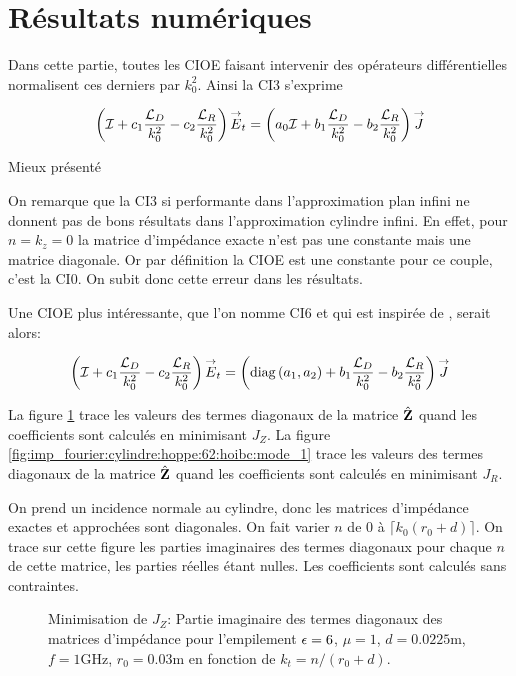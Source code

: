 \section{Résultats numériques}

  Dans cette partie, toutes les CIOE faisant intervenir des opérateurs différentielles normalisent ces derniers par \(k_0^2\). Ainsi la CI3 s'exprime
    
  \begin{equation*}
    \left({\mathcal{I}} + c_1\dfrac{{\mathcal{L}_D}}{k_0^2} -c_2\dfrac{{\mathcal{L}_R}}{k_0^2}\right){\overset{\rightarrow}{E}}_t = \left(a_0{\mathcal{I}} + b_1\dfrac{{\mathcal{L}_D}}{k_0^2} - b_2 \dfrac{{\mathcal{L}_R}}{k_0^2} \right){\overset{\rightarrow}{J}}
  \end{equation*}


  \begin{TODO}
    Mieux présenté
  \end{TODO}
  On remarque que la CI3 si performante dans l'approximation plan infini ne donnent pas de bons résultats dans l’approximation cylindre infini. 
  En effet, pour \(n=k_z=0\) la matrice d'impédance exacte n'est pas une constante mais une matrice diagonale. 
  Or par définition la CIOE est une constante pour ce couple, c'est la CI0. On subit donc cette erreur dans les résultats. 

  Une CIOE plus intéressante, que l'on nomme CI6 et qui est inspirée de \cite[p.~60]{hoppe_impedance_1995}, serait alors:

  \begin{equation*}
    \left({\mathcal{I}} + c_1\dfrac{{\mathcal{L}_D}}{k_0^2} -c_2\dfrac{{\mathcal{L}_R}}{k_0^2}\right){\overset{\rightarrow}{E}}_t = \left(\operatorname{diag}\left(a_1,a_2\right) + b_1\dfrac{{\mathcal{L}_D}}{k_0^2} - b_2 \dfrac{{\mathcal{L}_R}}{k_0^2} \right){\overset{\rightarrow}{J}}
  \end{equation*}

  La figure \ref{fig:imp_fourier:cylindre:hoppe:62:hoibc:mode_2} trace les valeurs des termes diagonaux de la matrice \(\hat{\mathbf{Z}}\) quand les coefficients sont calculés en minimisant \(J_Z\).
  La figure \ref{fig:imp_fourier:cylindre:hoppe:62:hoibc:mode_1} trace les valeurs des termes diagonaux de la matrice \(\hat{\mathbf{Z}}\) quand les coefficients sont calculés en minimisant \(J_R\).

  On prend un incidence normale au cylindre, donc les matrices d'impédance exactes et approchées sont diagonales. On fait varier \(n\) de 0 à \(\lceil k_0 (r_0+d) \rceil\). On trace sur cette figure les parties imaginaires des termes diagonaux pour chaque \(n\) de cette matrice, les parties réelles étant nulles. Les coefficients sont calculés sans contraintes.

  \begin{figure}[!hbt]
    \centering
    
    \caption[CIOE sur empilement de Hoppe & Rahmat-Samii p.~62]{Minimisation de \(J_Z\): Partie imaginaire des termes diagonaux des matrices d'impédance pour l'empilement \(\epsilon = 6\), \(\mu = 1\), \(d=0.0225\text{m}\), \(f=1\text{GHz}\), \(r_0=0.03\text{m}\) en fonction de \(k_t = n / (r_0+d)\).}
    \label{fig:imp_fourier:cylindre:hoppe:62:hoibc:mode_2}
  \end{figure}

